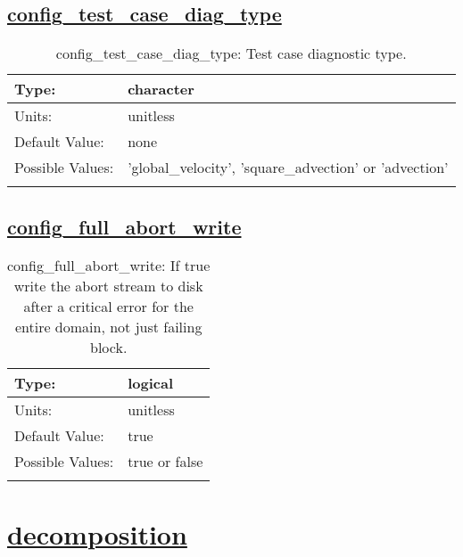 \subsection[config\_test\_case\_diag\_type]{\hyperref[sec:nm_tab_io]{config\_test\_case\_diag\_type}}
\label{subsec:nm_sec_config_test_case_diag_type}
\begin{center}
\begin{longtable}{| p{2.0in} || p{4.0in} |}
    \hline
    Type: & character \\
    \hline
    Units: & \si{unitless} \\
    \hline
    Default Value: & none \\
    \hline
    Possible Values: & 'global\_velocity', 'square\_advection' or 'advection' \\
    \hline
    \caption{config\_test\_case\_diag\_type: Test case diagnostic type.}
\end{longtable}
\end{center}
\subsection[config\_full\_abort\_write]{\hyperref[sec:nm_tab_io]{config\_full\_abort\_write}}
\label{subsec:nm_sec_config_full_abort_write}
\begin{center}
\begin{longtable}{| p{2.0in} || p{4.0in} |}
    \hline
    Type: & logical \\
    \hline
    Units: & \si{unitless} \\
    \hline
    Default Value: & true \\
    \hline
    Possible Values: & true or false \\
    \hline
    \caption{config\_full\_abort\_write: If true write the abort stream to disk after a critical error for the entire domain, not just failing block.}
\end{longtable}
\end{center}
\section[decomposition]{\hyperref[sec:nm_tab_decomposition]{decomposition}}
\label{sec:nm_sec_decomposition}
